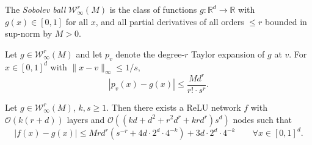 \begin{definition}\label{def:sobolevBall}
The \emph{Sobolev ball} $\mathcal{W}^r_\infty(M)$ is the class of functions $g : \mathbb{R}^d \to \mathbb{R}$
with $g(x) \in [0,1]$ for all $x$, and all partial derivatives of all orders $\leq r$ bounded in
sup-norm by $M > 0$.
\end{definition}

\begin{theorem}\label{thm:taylorError}
Let $g \in \mathcal{W}^r_\infty(M)$ and let $p_v$ denote the degree-$r$ Taylor expansion of $g$ at $v$.
For $x \in [0,1]^d$ with $\|x - v\|_\infty \leq 1/s$,
\[
  |p_v(x) - g(x)| \leq \frac{M d^r}{r! \cdot s^r}.
\]
\end{theorem}

\begin{theorem}\label{thm:sobolevBallApprox}
Let $g \in \mathcal{W}^r_\infty(M)$, $k, s \geq 1$.
Then there exists a ReLU network $f$ with $\mathcal{O}(k(r+d))$ layers and
$\mathcal{O}((kd + d^2 + r^2 d^r + krd^r) s^d)$ nodes such that
\[
  |f(x) - g(x)| \leq M r d^r \!\left(s^{-r} + 4d \cdot 2^d \cdot 4^{-k}\right) + 3d \cdot 2^d \cdot 4^{-k}
  \qquad \forall x \in [0,1]^d.
\]
\end{theorem}

